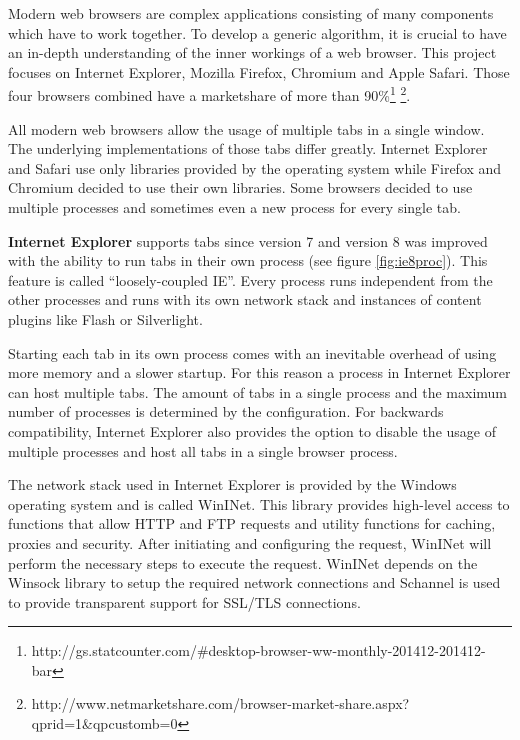 

Modern web browsers are complex applications consisting of many components which have to work together. To develop a generic algorithm, it is crucial to have an in-depth understanding of the inner workings of a web browser. This project focuses on Internet Explorer, Mozilla Firefox, Chromium and Apple Safari. Those four browsers combined have a marketshare of more than 90\%\footnote{http://gs.statcounter.com/\#desktop-browser-ww-monthly-201412-201412-bar} \footnote{http://www.netmarketshare.com/browser-market-share.aspx?qprid=1\&qpcustomb=0}.

All modern web browsers allow the usage of multiple tabs in a single window. The underlying implementations of those tabs differ greatly. Internet Explorer and Safari use only libraries provided by the operating system while Firefox and Chromium decided to use their own libraries. Some browsers decided to use multiple processes and sometimes even a new process for every single tab.

\textbf{Internet Explorer} supports tabs since version 7 and version 8 was improved with the ability to run tabs in their own process (see figure \ref{fig:ie8proc}). This feature is called ``loosely-coupled IE''\cite{IE8LCIE}. Every process runs independent from the other processes and runs with its own network stack and instances of content plugins like Flash or Silverlight.

Starting each tab in its own process comes with an inevitable overhead of using more memory and a slower startup. For this reason a process in Internet Explorer can host multiple tabs. The amount of tabs in a single process and the maximum number of processes is determined by the configuration. For backwards compatibility, Internet Explorer also provides the option to disable the usage of multiple processes and host all tabs in a single browser process.

\label{sec:brie}
The network stack used in Internet Explorer is provided by the Windows operating system and is called WinINet\cite{wininet}. This library provides high-level access to functions that allow HTTP and FTP requests and utility functions for caching, proxies and security. After initiating and configuring the request, WinINet will perform the necessary steps to execute the request. WinINet depends on the Winsock library \cite{winsock} to setup the required network connections and Schannel \cite{schannel} is used to provide transparent support for SSL/TLS connections.

